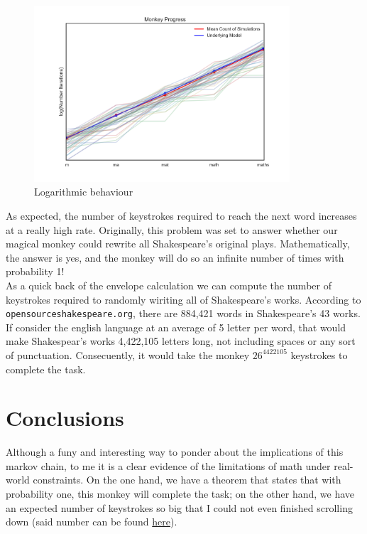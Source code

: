 \documentclass{article}
\begin{document}
\begin{figure}[h]
    \centering
    \includegraphics[width=0.85\textwidth]{log_approx}
    \caption{Logarithmic behaviour}
\end{figure}


As expected, the number of keystrokes required to reach the next word increases at a really high rate. Originally, this problem was set to answer whether our magical monkey could rewrite all Shakespeare's original plays. Mathematically, the answer is yes, and the monkey will do so an infinite number of times with probability 1!\\

As a quick back of the envelope calculation we can compute the number of keystrokes required to randomly wiriting all of Shakespeare's works. According to \texttt{opensourceshakespeare.org}, there are 884,421 words in Shakespeare's 43 works. If consider the english language at an average of 5 letter per word, that would make Shakespear's works 4,422,105 letters long, not including spaces or any sort of punctuation. Consecuently, it would take the monkey $26 ^ {4422105} $ keystrokes to complete the task.

\section{Conclusions}
Although a funy and interesting way to ponder about the implications of this markov chain, to me it is a clear evidence of the limitations of math under real-world constraints. On the one hand, we have a theorem that states that with probability one, this monkey will complete the task; on the other hand, we have an expected number of keystrokes so big that I could not even finished scrolling down (said number can be found \href{https://github.com/gerdm/UMA/blob/master/stochastic_processes/final_proyect/monkey_notebook.ipynb}{here}).\\
\end{document}
